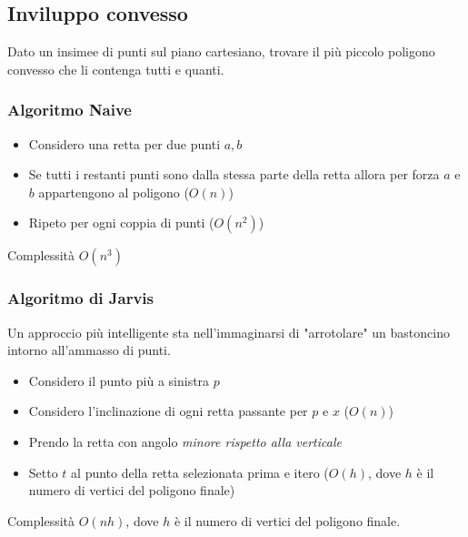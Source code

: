 \subsection{Inviluppo convesso}
Dato un insimee di punti sul piano cartesiano, trovare il più piccolo poligono convesso che li contenga tutti e quanti.
\subsubsection{Algoritmo Naive}
\begin{itemize}
	\item Considero una retta per due punti $ a,b $
	\item Se tutti i restanti punti sono dalla stessa parte della retta allora per forza $ a $ e $ b $ appartengono al poligono ($ O\left(n\right) $)
	\item Ripeto per ogni coppia di punti ($ O\left(n^2 \right) $)
\end{itemize}
Complessità $ O\left(n^3\right) $

\subsubsection{Algoritmo di Jarvis}
Un approccio più intelligente sta nell'immaginarsi di "arrotolare" un bastoncino intorno all'ammasso di punti.
\begin{itemize}
	\item Considero il punto più a sinistra $ p $
	\item Considero l'inclinazione di ogni retta passante per $ p $ e $ x $ ($ O\left(n\right) $)
	\item Prendo la retta con angolo \textit{minore rispetto alla verticale}
	\item Setto $ t $ al punto della retta selezionata prima e itero ($ O\left(h\right) $, dove $ h $ è il numero di vertici del poligono finale)
\end{itemize}
Complessità $ O\left(nh\right) $, dove $ h $ è il numero di vertici del poligono finale.
